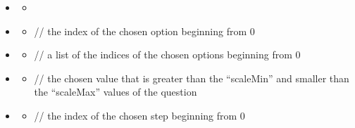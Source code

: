\documentclass[a4paper]{scrreprt}
\begin{document}
\begin{itemize}
                   \item {}
                       \begin{itemize}
                           \item {}
                       \end{itemize}

                    \item {}
                        \begin{itemize}
                            \item {}
                                \par // the index of the chosen option beginning from 0
                        \end{itemize}
                        
                   \item {}
                       \begin{itemize}
                           \item {}
                               \par // a list of the indices of the chosen options beginning from 0
                       \end{itemize}
                       
                    \item {}
                        \begin{itemize}
                            \item {}
                                \par // the chosen value that is greater than the “scaleMin” and smaller than the “scaleMax” values of the question
                        \end{itemize}
                        
                    \item {}
                        \begin{itemize}
                            \item {}
                                \par // the index of the chosen step beginning from 0
                        \end{itemize}

            \end{itemize}
            
\end{document}

